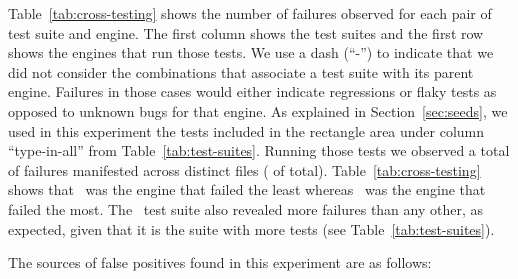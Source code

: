 \documentclass[smallextended]{svjour3}
\begin{document}
Table~\ref{tab:cross-testing} shows the number of failures observed
for each pair of test suite and engine. The first column shows the
test suites and the first row shows the engines that run those
tests. We use a dash (``-'') to indicate that we did not consider the
combinations that associate a test suite with its parent engine.
Failures in those cases would either indicate regressions or flaky
tests as opposed to unknown bugs for that engine. As explained in
Section~\ref{sec:seeds}, we used in this experiment the
\totalTestFilesForTestTransplantation{} tests included in the
rectangle area under column ``type-in-all'' from
Table~\ref{tab:test-suites}. Running those tests we observed a total
of \failuresTestTrans{} failures manifested across
\failuresTestTransDistictFiles{} distinct files
(\failuresTestTransPercent{} of total).  Table~\ref{tab:cross-testing}
shows that \smonkey\ was the engine that failed the least whereas
\chakra\ was the engine that failed the most. The \smonkey\ test suite
also revealed more failures than any other, as expected, given
that it is the suite with more tests (see
Table~\ref{tab:test-suites}).



\sloppy The sources of false positives found in this experiment are as
follows:
\end{document}

